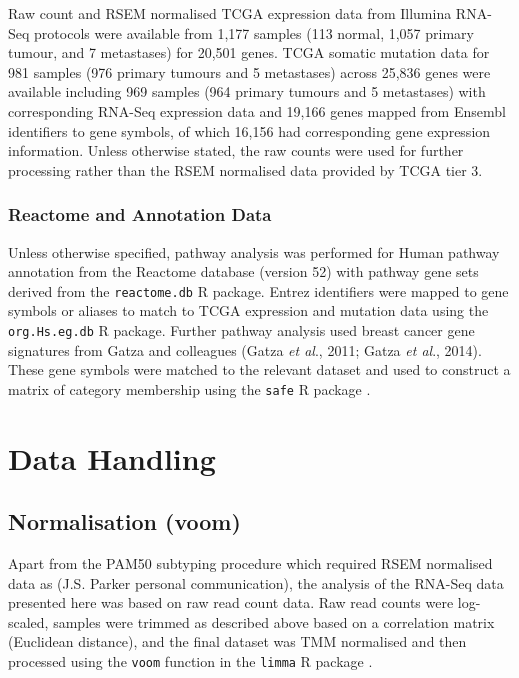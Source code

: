 Raw count and RSEM normalised TCGA expression data from Illumina RNA-Seq protocols were available from 1,177 samples (113 normal, 1,057 primary tumour, and 7 metastases) for 20,501 genes. TCGA somatic mutation data for 981 samples (976 primary tumours and 5 metastases) across 25,836 genes were available including 969 samples (964 primary tumours and 5 metastases) with corresponding RNA-Seq expression data and 19,166 genes mapped from Ensembl identifiers to gene symbols, of which 16,156 had corresponding gene expression information. Unless otherwise stated, the raw counts were used for further processing rather than the RSEM normalised data provided by TCGA tier 3.

\subsubsection{Reactome and Annotation Data} \label{methods:gene_set}

Unless otherwise specified, pathway analysis was performed for Human pathway annotation from the Reactome database (version 52) with pathway gene sets derived from the \texttt{reactome.db} R package. Entrez identifiers were mapped to gene symbols or aliases to match to TCGA expression and mutation data using the \texttt{org.Hs.eg.db} R package. Further pathway analysis used breast cancer gene signatures from Gatza and colleagues (Gatza \textit{et al}., 2011; Gatza \textit{et al}., 2014). These gene symbols were matched to the relevant dataset and used to construct a matrix of category membership using the \texttt{safe} R package \citep{safe}.

\section{Data Handling}

\subsection{Normalisation (voom)}

Apart from the PAM50 subtyping procedure \citep{Parker2009} which required RSEM normalised data as (J.S. Parker personal communication), the analysis of the RNA-Seq data presented here was based on raw read count data. Raw read counts were log-scaled, samples were trimmed as described above based on a correlation matrix (Euclidean distance), and the final dataset was TMM normalised \citep{Robinson2010} and then processed using the \texttt{voom} function \citep{Law2014} in the \texttt{limma} R package \citep{limma}.

